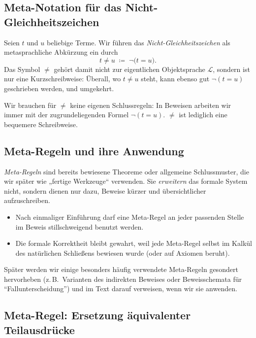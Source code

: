 \documentclass[main.tex]{subfiles}
\begin{document}
\subsection{Meta-Notation für das Nicht-Gleichheitszeichen}

\begin{definition}
\label{def:neq-meta}
Seien \(t\) und \(u\) beliebige Terme. Wir führen das
\emph{Nicht-Gleichheitszeichen} als metasprachliche Abkürzung ein durch
\[
  t \neq u \;\coloneqq\; \neg\bigl(t = u\bigr).
\]
Das Symbol \(\neq\) gehört damit nicht zur eigentlichen Objektsprache
\(\mathcal L\), sondern ist nur eine Kurzschreibweise:
Überall, wo \(t \neq u\) steht, kann ebenso gut \(\neg(t = u)\)
geschrieben werden, und umgekehrt.
\end{definition}

\begin{remark}
Wir brauchen für \(\neq\) keine eigenen Schlussregeln: In Beweisen
arbeiten wir immer mit der zugrundeliegenden Formel \(\neg(t = u)\).
\(\neq\) ist lediglich eine bequemere Schreibweise.
\end{remark}


\subsection{Meta-Regeln und ihre Anwendung}

\emph{Meta-Regeln} sind bereits bewiesene Theoreme oder allgemeine
Schlussmuster, die wir später wie „fertige Werkzeuge“ verwenden.
Sie \emph{erweitern} das formale System nicht, sondern dienen nur
dazu, Beweise kürzer und übersichtlicher aufzuschreiben.

\begin{itemize}
  \item Nach einmaliger Einführung darf eine Meta-Regel an jeder
        passenden Stelle im Beweis stillschweigend benutzt werden.
  \item Die formale Korrektheit bleibt gewahrt, weil jede Meta-Regel
        selbst im Kalkül des natürlichen Schließens bewiesen wurde
        (oder auf Axiomen beruht).
\end{itemize}

Später werden wir einige besonders häufig verwendete Meta-Regeln
gesondert hervorheben (z.\,B.\ Varianten des indirekten Beweises
oder Beweisschemata für \enquote{Fallunterscheidung}) und im Text
darauf verweisen, wenn wir sie anwenden.

\subsection{Meta-Regel: Ersetzung äquivalenter Teilausdrücke}
\end{document}
